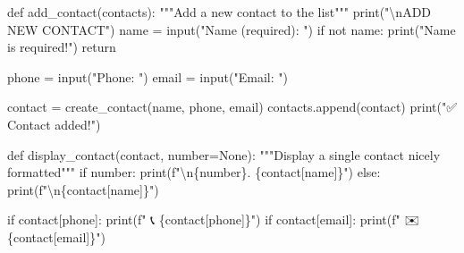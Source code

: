 \documentclass[
  letterpaper,
  DIV=11,
  numbers=noendperiod,
  oneside]{scrreprt}
\newenvironment{Shaded}{}{}
\newcommand{\BuiltInTok}[1]{\textcolor[rgb]{0.84,0.23,0.29}{#1}}
\newcommand{\CharTok}[1]{\textcolor[rgb]{0.01,0.18,0.38}{#1}}
\newcommand{\CommentTok}[1]{\textcolor[rgb]{0.42,0.45,0.49}{#1}}
\newcommand{\ControlFlowTok}[1]{\textcolor[rgb]{0.84,0.23,0.29}{#1}}
\newcommand{\KeywordTok}[1]{\textcolor[rgb]{0.84,0.23,0.29}{#1}}
\newcommand{\NormalTok}[1]{\textcolor[rgb]{0.14,0.16,0.18}{#1}}
\newcommand{\OperatorTok}[1]{\textcolor[rgb]{0.14,0.16,0.18}{#1}}
\newcommand{\SpecialCharTok}[1]{\textcolor[rgb]{0.00,0.36,0.77}{#1}}
\newcommand{\SpecialStringTok}[1]{\textcolor[rgb]{0.01,0.18,0.38}{#1}}
\newcommand{\StringTok}[1]{\textcolor[rgb]{0.01,0.18,0.38}{#1}}
\newcommand{\VariableTok}[1]{\textcolor[rgb]{0.89,0.38,0.04}{#1}}
\begin{document}
\begin{Shaded}
\begin{Highlighting}[]
\KeywordTok{def}\NormalTok{ add\_contact(contacts):}
    \CommentTok{"""Add a new contact to the list"""}
    \BuiltInTok{print}\NormalTok{(}\StringTok{"}\CharTok{\textbackslash{}n}\StringTok{ADD NEW CONTACT"}\NormalTok{)}
\NormalTok{    name }\OperatorTok{=} \BuiltInTok{input}\NormalTok{(}\StringTok{"Name (required): "}\NormalTok{)}
    \ControlFlowTok{if} \KeywordTok{not}\NormalTok{ name:}
        \BuiltInTok{print}\NormalTok{(}\StringTok{"Name is required!"}\NormalTok{)}
        \ControlFlowTok{return}
    
\NormalTok{    phone }\OperatorTok{=} \BuiltInTok{input}\NormalTok{(}\StringTok{"Phone: "}\NormalTok{)}
\NormalTok{    email }\OperatorTok{=} \BuiltInTok{input}\NormalTok{(}\StringTok{"Email: "}\NormalTok{)}
    
\NormalTok{    contact }\OperatorTok{=}\NormalTok{ create\_contact(name, phone, email)}
\NormalTok{    contacts.append(contact)}
    \BuiltInTok{print}\NormalTok{(}\StringTok{"✅ Contact added!"}\NormalTok{)}

\KeywordTok{def}\NormalTok{ display\_contact(contact, number}\OperatorTok{=}\VariableTok{None}\NormalTok{):}
    \CommentTok{"""Display a single contact nicely formatted"""}
    \ControlFlowTok{if}\NormalTok{ number:}
        \BuiltInTok{print}\NormalTok{(}\SpecialStringTok{f"}\CharTok{\textbackslash{}n}\SpecialCharTok{\{}\NormalTok{number}\SpecialCharTok{\}}\SpecialStringTok{. }\SpecialCharTok{\{}\NormalTok{contact[}\StringTok{\textquotesingle{}name\textquotesingle{}}\NormalTok{]}\SpecialCharTok{\}}\SpecialStringTok{"}\NormalTok{)}
    \ControlFlowTok{else}\NormalTok{:}
        \BuiltInTok{print}\NormalTok{(}\SpecialStringTok{f"}\CharTok{\textbackslash{}n}\SpecialCharTok{\{}\NormalTok{contact[}\StringTok{\textquotesingle{}name\textquotesingle{}}\NormalTok{]}\SpecialCharTok{\}}\SpecialStringTok{"}\NormalTok{)}
    
    \ControlFlowTok{if}\NormalTok{ contact[}\StringTok{\textquotesingle{}phone\textquotesingle{}}\NormalTok{]:}
        \BuiltInTok{print}\NormalTok{(}\SpecialStringTok{f"   📞 }\SpecialCharTok{\{}\NormalTok{contact[}\StringTok{\textquotesingle{}phone\textquotesingle{}}\NormalTok{]}\SpecialCharTok{\}}\SpecialStringTok{"}\NormalTok{)}
    \ControlFlowTok{if}\NormalTok{ contact[}\StringTok{\textquotesingle{}email\textquotesingle{}}\NormalTok{]:}
        \BuiltInTok{print}\NormalTok{(}\SpecialStringTok{f"   ✉️  }\SpecialCharTok{\{}\NormalTok{contact[}\StringTok{\textquotesingle{}email\textquotesingle{}}\NormalTok{]}\SpecialCharTok{\}}\SpecialStringTok{"}\NormalTok{)}
\end{Highlighting}
\end{Shaded}
\end{document}
